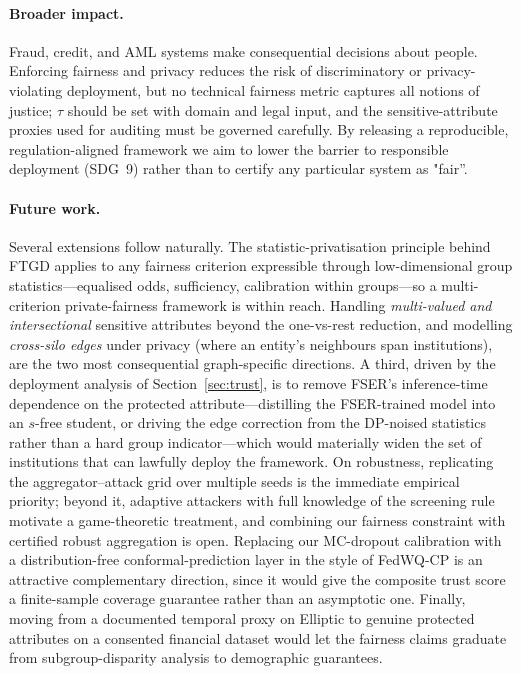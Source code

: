 \documentclass[pdflatex,sn-mathphys-num]{sn-jnl}
\theoremstyle{thmstyleone}%
\theoremstyle{thmstyletwo}%
\theoremstyle{thmstylethree}%
\begin{document}
\paragraph{Broader impact.}
Fraud, credit, and AML systems make consequential decisions about people.
Enforcing fairness and privacy reduces the risk of discriminatory or
privacy-violating deployment, but no technical fairness metric captures all
notions of justice; $\tau$ should be set with domain and legal input, and the
sensitive-attribute proxies used for auditing must be governed carefully. By
releasing a reproducible, regulation-aligned framework we aim to lower the
barrier to responsible deployment (SDG~9) rather than to certify any particular
system as "fair''.

\paragraph{Future work.}
Several extensions follow naturally. The statistic-privatisation principle
behind FTGD applies to any fairness criterion expressible through
low-dimensional group statistics---equalised odds, sufficiency, calibration
within groups---so a multi-criterion private-fairness framework is within reach.
Handling \emph{multi-valued and intersectional} sensitive attributes beyond the
one-vs-rest reduction, and modelling \emph{cross-silo edges} under privacy
(where an entity's neighbours span institutions), are the two most consequential
graph-specific directions. A third, driven by the deployment analysis of
Section~\ref{sec:trust}, is to remove FSER's inference-time dependence on the
protected attribute---distilling the FSER-trained model into an $s$-free student,
or driving the edge correction from the DP-noised statistics rather than a hard
group indicator---which would materially widen the set of institutions that can
lawfully deploy the framework. On robustness, replicating the
aggregator--attack grid over multiple seeds is the immediate empirical priority;
beyond it, adaptive attackers with full knowledge
of the screening rule motivate a game-theoretic treatment, and combining our
fairness constraint with certified robust aggregation is open. Replacing our
MC-dropout calibration with a distribution-free conformal-prediction layer in
the style of FedWQ-CP \cite{nguyen2026conformal} is an attractive
complementary direction, since it would give the composite trust score a
finite-sample coverage guarantee rather than an asymptotic one. Finally,
moving from a documented temporal proxy on Elliptic to genuine protected
attributes on a consented financial dataset would let the fairness claims
graduate from subgroup-disparity analysis to demographic guarantees.
\end{document}
